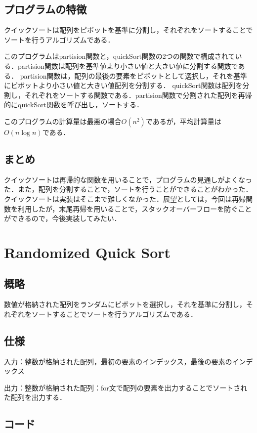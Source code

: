\documentclass{ltjsarticle}
\begin{document}
\subsection{プログラムの特徴}
クイックソートは配列をピボットを基準に分割し，それぞれをソートすることでソートを行うアルゴリズムである．

このプログラムはpartision関数と，quickSort関数の2つの関数で構成されている．partision関数は配列を基準値より小さい値と大きい値に分割する関数である．
partision関数は，配列の最後の要素をピボットとして選択し，それを基準にピボットより小さい値と大きい値配列を分割する．
quickSort関数は配列を分割し，それぞれをソートする関数である．partision関数で分割された配列を再帰的にquickSort関数を呼び出し，ソートする．

このプログラムの計算量は最悪の場合$O(n^2)$であるが，平均計算量は$O(n\log n)$である．
\subsection{まとめ}
クイックソートは再帰的な関数を用いることで，プログラムの見通しがよくなった．また，配列を分割することで，ソートを行うことができることがわかった．
クイックソートは実装はそこまで難しくなかった．展望としては，今回は再帰関数を利用したが，末尾再帰を用いることで，スタックオーバーフローを防ぐことができるので，今後実装してみたい．

\section{Randomized Quick Sort}
\subsection{概略}
数値が格納された配列をランダムにピボットを選択し，それを基準に分割し，それぞれをソートすることでソートを行うアルゴリズムである．

\subsection{仕様}
\noindent 入力：整数が格納された配列，最初の要素のインデックス，最後の要素のインデックス

\noindent 出力：整数が格納された配列：for文で配列の要素を出力することでソートされた配列を出力する．
\subsection{コード}
\end{document}
